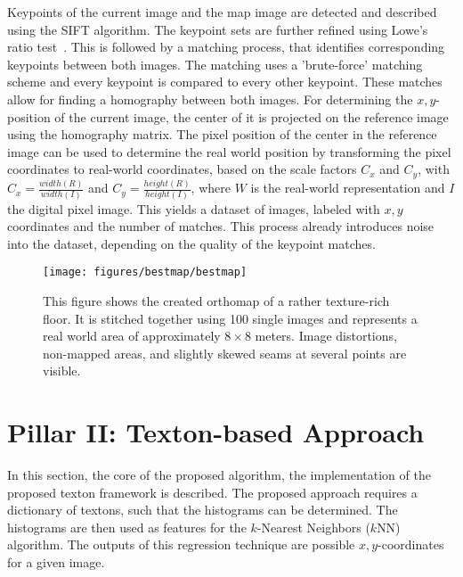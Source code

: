\documentclass{report}
\begin{document}
Keypoints of the current image and the map image are detected and
described using the SIFT algorithm. The keypoint sets are further
refined using Lowe's ratio test~\cite{lowe1999object}. This is
followed by a matching process, that identifies corresponding
keypoints between both images. The matching uses a 'brute-force'
matching scheme and every keypoint is compared to every other
keypoint. These matches allow for finding a homography between both
images. For determining the $x, y$-position of the current image, the
center of it is projected on the reference image using the homography
matrix. The pixel position of the center in the reference image can be
used to determine the real world position by transforming the pixel
coordinates to real-world coordinates, based on the scale factors
$C_x$ and $C_y$, with $C_x = \frac{width(R)}{width(I)}$ and
$C_y = \frac{height(R)}{height(I)}$, where $W$ is the real-world
representation and $I$ the digital pixel image. This yields a dataset
of images, labeled with $x, y$ coordinates and the number of
matches. This process already introduces noise into the dataset,
depending on the quality of the keypoint matches.


\begin{figure}[h!]
\begin{center}
\texttt{[image: figures/bestmap/bestmap]}
\caption{{\label{fig:orthomap}
This figure shows
    the created orthomap of a rather texture-rich floor. It is
    stitched together using 100 single images and represents a
    real world area of approximately $8\times8$ meters. Image
    distortions, non-mapped areas, and slightly skewed seams at
    several points are visible.%
}}
\end{center}
\end{figure}

\section{Pillar II: Texton-based Approach}
\label{sec:textons}

In this section, the core of the proposed algorithm, the
implementation of the proposed texton framework is described. The
proposed approach requires a dictionary of textons, such that the
histograms can be determined. The histograms are then used as features
for the $k$-Nearest Neighbors ($k$NN) algorithm. The outputs of this
regression technique are possible $x,y$-coordinates for a given image.
\end{document}
